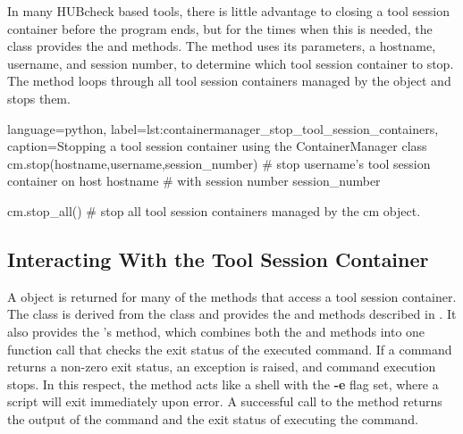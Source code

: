 

In many HUBcheck based tools, there is little advantage to closing a tool
session container before the program ends, but for the times when this is
needed, the  class provides the  and
 methods. The  method uses its
parameters, a hostname, username, and session number, to determine which tool
session container to stop.  The  method loops through all
tool session containers managed by the  object and
stops them.

\begin{xcode}{%
  language=python,%
  label=lst:containermanager_stop_tool_session_containers,%
  caption={Stopping a tool session container using the ContainerManager class}%
}
cm.stop(hostname,username,session_number)
# stop username's tool session container on host hostname
# with session number session_number

cm.stop_all()
# stop all tool session containers managed by the cm object.
\end{xcode}


\subsection{Interacting With the Tool Session Container}
\label{ssec:hubcheck_shell_modules_interacting_containers}

A  object is returned for many of the methods that
access a tool session container. The  class is
derived from the  class and provides the 
and  methods described in
. It also provides the
's  method, which combines both the
 and  methods into one function call that
checks the exit status of the executed command. If a command returns a
non-zero exit status, an  exception is raised, and
command execution stops. In this respect, the  method acts
like a shell with the \textbf{-e} flag set, where a script will exit
immediately upon error. A successful call to the  method
returns the output of the command and the exit status of executing the command.

